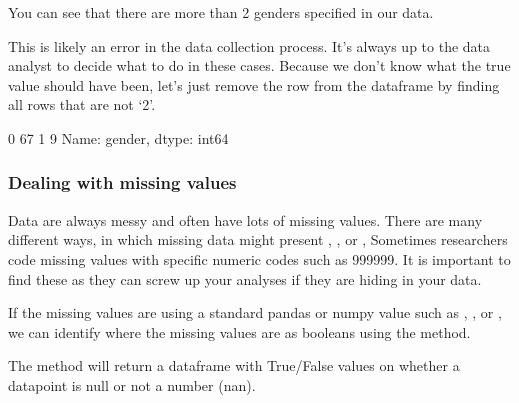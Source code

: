 \documentclass[letterpaper,10pt,english]{sphinxmanual}
\begin{document}
You can see that there are more than 2 genders specified in our data.

This is likely an error in the data collection process. It’s always up to the data analyst to decide what to do in these cases. Because we don’t know what the true value should have been, let’s just remove the row from the dataframe by finding all rows that are not ‘2’.

\begin{sphinxVerbatim}[commandchars=\\\{\}]
  \PYG{p}{[}\PYG{p}{[}\PYG{p}{]}\PYG{p}{]}

\PYG{p}{[}\PYG{p}{]}
\end{sphinxVerbatim}

\begin{sphinxVerbatim}[commandchars=\\\{\}]
0    67
1     9
Name: gender, dtype: int64
\end{sphinxVerbatim}


\subsubsection{Dealing with missing values}
\label{\detokenize{content/Introduction_to_Pandas:dealing-with-missing-values}}
Data are always messy and often have lots of missing values. There are many different ways, in which missing data might present , , or , Sometimes researchers code missing values with specific numeric codes such as 999999. It is important to find these as they can screw up your analyses if they are hiding in your data.

If the missing values are using a standard pandas or numpy value such as , , or , we can identify where the missing values are as booleans using the  method.

The  method will return a dataframe with True/False values on whether a datapoint is null or not a number (nan).

\begin{sphinxVerbatim}[commandchars=\\\{\}]
\end{sphinxVerbatim}
\end{document}

